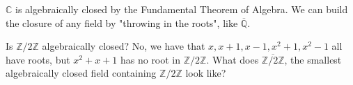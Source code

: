 \begin{remark}
    \(\mathbb{C} \) is algebraically closed by the Fundamental Theorem of Algebra. We can build the closure of any field by "throwing in the roots", like \(\overline{\mathbb{Q}} \).
\end{remark}
\begin{eg}
	Is \(\mathbb{Z} /2\mathbb{Z} \) algebraically closed? No, we have that \(x, x+1, x-1, x^2 +1, x^2 -1\) all have roots, but \(x^2 +x+1\) has no root in \(\mathbb{Z} /2\mathbb{Z} \). What does \(\overline{\mathbb{Z} /2\mathbb{Z} } \), the smallest algebraically closed field containing \(\mathbb{Z} /2\mathbb{Z} \) look like?     
\end{eg}